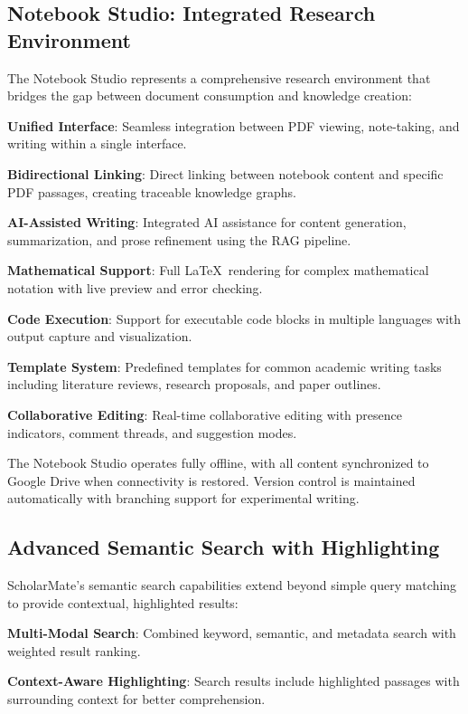 \documentclass[conference]{IEEEtran}
\begin{document}
\subsection{Notebook Studio: Integrated Research Environment}

The Notebook Studio represents a comprehensive research environment that bridges the gap between document consumption and knowledge creation:

\textbf{Unified Interface}: Seamless integration between PDF viewing, note-taking, and writing within a single interface.

\textbf{Bidirectional Linking}: Direct linking between notebook content and specific PDF passages, creating traceable knowledge graphs.

\textbf{AI-Assisted Writing}: Integrated AI assistance for content generation, summarization, and prose refinement using the RAG pipeline.

\textbf{Mathematical Support}: Full \LaTeX\ rendering for complex mathematical notation with live preview and error checking.

\textbf{Code Execution}: Support for executable code blocks in multiple languages with output capture and visualization.

\textbf{Template System}: Predefined templates for common academic writing tasks including literature reviews, research proposals, and paper outlines.

\textbf{Collaborative Editing}: Real-time collaborative editing with presence indicators, comment threads, and suggestion modes.

The Notebook Studio operates fully offline, with all content synchronized to Google Drive when connectivity is restored. Version control is maintained automatically with branching support for experimental writing.

\subsection{Advanced Semantic Search with Highlighting}

ScholarMate's semantic search capabilities extend beyond simple query matching to provide contextual, highlighted results:

\textbf{Multi-Modal Search}: Combined keyword, semantic, and metadata search with weighted result ranking.

\textbf{Context-Aware Highlighting}: Search results include highlighted passages with surrounding context for better comprehension.
\end{document}
